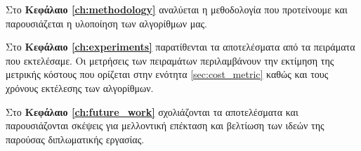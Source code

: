 Στο \textbf{Κεφάλαιο \ref{ch:methodology}} αναλύεται η μεθοδολογία 
που προτείνουμε και παρουσιάζεται η υλοποίηση των αλγορίθμων μας.

Στο \textbf{Κεφάλαιο \ref{ch:experiments}} παρατίθενται τα αποτελέσματα 
από τα πειράματα που εκτελέσαμε. 
Οι μετρήσεις των πειραμάτων περιλαμβάνουν την εκτίμηση της μετρικής 
κόστους που ορίζεται στην ενότητα \ref{sec:cost_metric} καθώς και τους χρόνους
εκτέλεσης των αλγορίθμων. 

Στο \textbf{Κεφάλαιο \ref{ch:future_work}} σχολιάζονται τα αποτελέσματα
και παρουσιάζονται σκέψεις για μελλοντική επέκταση και βελτίωση των 
ιδεών της παρούσας διπλωματικής εργασίας.
